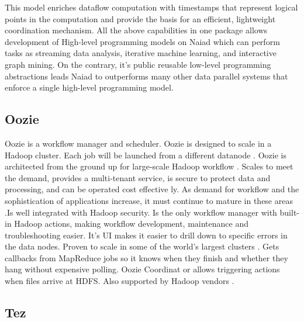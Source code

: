     This model enriches dataflow computation with timestamps that
    represent logical points in the computation and provide the basis
    for an efficient, lightweight coordination mechanism.  All the
    above capabilities in one package allows development of High-level
    programming models on Naiad which can perform tasks as streaming
    data analysis, iterative machine learning, and interactive graph
    mining. On the contrary, it's public reusable low-level
    programming abstractions leads Naiad to outperforms many other
    data parallel systems that enforce a single high-level programming
    model.

    \pv
    
\subsection{Oozie}

Oozie is a workflow manager and scheduler. Oozie is designed to scale
in a Hadoop cluster. Each job will be launched from a different
datanode \cite{paper-Oozie} \cite{www-Oozie1}. Oozie is architected from
the ground up for large-scale Hadoop workflow \cite{www-Oozie2}.
Scales to meet the demand, provides a multi-tenant
service, is secure to protect data and processing, and can be operated
cost effective ly. As demand for workflow and the sophistication of
applications increase, it must continue to mature in these areas
\cite{paper-Oozie}.Is well integrated with Hadoop security. Is the
only workflow manager with built-in Hadoop actions, making workflow
development, maintenance and troubleshooting easier. It’s UI makes it
easier to drill down to specific errors in the data nodes. Proven to
scale in some of the world’s largest clusters \cite{paper-Oozie}. Gets
callbacks from MapReduce jobs so it knows when they finish and whether
they hang without expensive polling. Oozie Coordinat or allows
triggering actions when files arrive at HDFS. Also supported by Hadoop
vendors \cite{paper-Oozie}.


\pv


\subsection{Tez}

